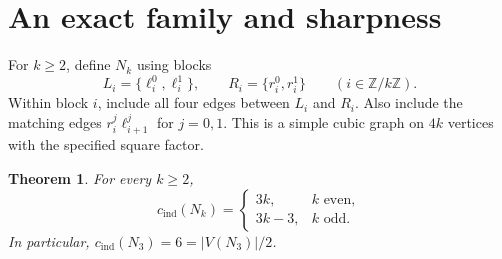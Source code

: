 \documentclass[11pt]{article}
\newtheorem{theorem}{Theorem}[section]
\newcommand{\cind}{c_{\mathrm{ind}}}
\begin{document}
\section{An exact family and sharpness}\label{sec:necklace}
For $k\geq2$, define $N_k$ using blocks
\[
 L_i=\{\ell_i^0,\ell_i^1\},\qquad
 R_i=\{r_i^0,r_i^1\}\qquad (i\in\mathbb Z/k\mathbb Z).
\]
Within block $i$, include all four edges between $L_i$ and $R_i$.
Also include the matching edges $r_i^j\ell_{i+1}^j$ for $j=0,1$.
This is a simple cubic graph on $4k$ vertices with the specified square
factor.

\begin{theorem}\label{thm:necklace}
For every $k\geq2$,
\[
 \cind(N_k)=
 \begin{cases}
  3k,& k\text{ even},\\
  3k-3,& k\text{ odd}.
 \end{cases}
\]
In particular, $\cind(N_3)=6=|V(N_3)|/2$.
\end{theorem}
\end{document}
